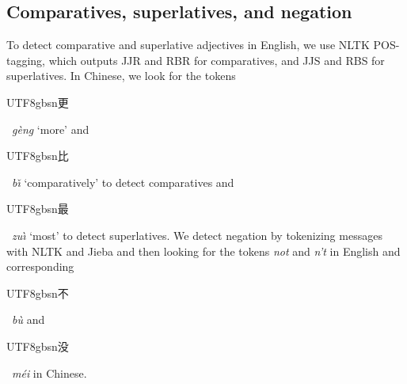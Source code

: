 \documentclass[11pt,a4paper]{article}
\newenvironment{zh}{\begin{CJK}{UTF8}{gbsn}}{\end{CJK}}
\newcommand{\textzh}[2]{\begin{zh}#1\end{zh}~\emph{#2}}
\renewcommand{\|}{\mid}
\begin{document}

\subsection{Comparatives, superlatives, and negation}

To detect comparative and superlative adjectives in English, we use NLTK POS-tagging, which outputs JJR and RBR for comparatives, and JJS and RBS for superlatives. In Chinese, we look for the tokens \textzh{更}{g\`eng} `more' and \textzh{比}{b\v{\i}} `comparatively' to detect comparatives and \textzh{最}{zu\`{\i}} `most' to detect superlatives. We detect negation by tokenizing messages with NLTK and Jieba and then looking for the tokens \emph{not} and \emph{n't} in English and corresponding \textzh{不}{b\`u} 
and \textzh{没}{m\'ei} 
in Chinese.
\end{document}
